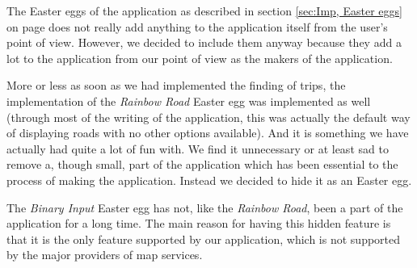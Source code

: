 The Easter eggs of the application as described in section \ref{sec:Imp, Easter eggs} on page \pageref{sec:Imp, Easter eggs} does not really add anything to the application itself from the user's point of view. However, we decided to include them anyway because they add a lot to the application from our point of view as the makers of the application.

More or less as soon as we had implemented the finding of trips, the implementation of the \textit{Rainbow Road} Easter egg was implemented as well (through most of the writing of the application, this was actually the default way of displaying roads with no other options available). And it is something we have actually had quite a lot of fun with. We find it unnecessary or at least sad to remove a, though small, part of the application which has been essential to the process of making the application. Instead we decided to hide it as an Easter egg.

The \textit{Binary Input} Easter egg has not, like the \textit{Rainbow Road}, been a part of the application for a long time. The main reason for having this hidden feature is that it is the only feature supported by our application, which is not supported by the major providers of map services.
